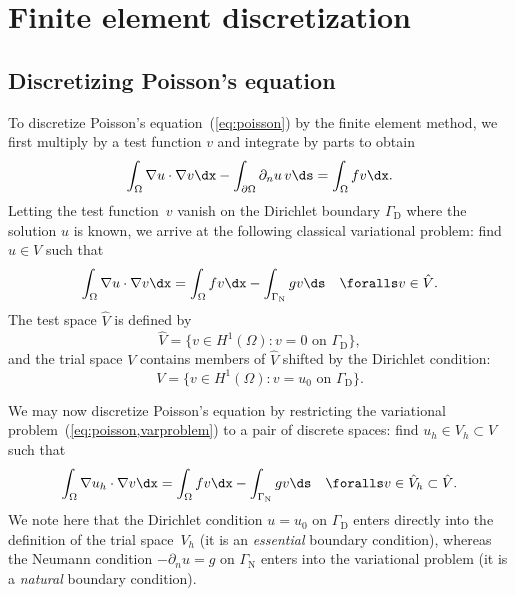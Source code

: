 \section{Finite element discretization}

\subsection{Discretizing Poisson's equation}

To discretize Poisson's equation~(\ref{eq:poisson}) by the finite
element method, we first multiply by a test function $v$ and integrate
by parts to obtain
\begin{equation}
  \int_{\Omega} \nabla u \cdot \nabla v \dx
  - \int_{\partial \Omega} \partial_n u \, v \ds
  =
  \int_{\Omega} f v \dx.
\end{equation}
Letting the test function~$v$ vanish on the Dirichlet boundary
$\Gamma_{\mathrm{D}}$ where the solution $u$ is known, we arrive at
the following classical variational problem: find $u \in V$ such that
\begin{equation} \label{eq:poisson,varproblem}
  \int_{\Omega} \nabla u \cdot \nabla v \dx =
  \int_{\Omega} f v \dx - \int_{\Gamma_{\mathrm{N}}} g v \ds
  \quad \foralls v \in \hat{V}.
\end{equation}
The test space $\hat{V}$ is defined by
\begin{equation}
  \hat{V} = \{v \in H^1(\Omega) : v = 0 \mbox{ on } \Gamma_{\mathrm{D}}\},
\end{equation}
and the trial space \( V \) contains members of \( \hat{V} \) shifted
by the Dirichlet condition:
\begin{equation}
  V = \{ v \in H^1(\Omega) : v = u_0 \mbox{ on } \Gamma_{\mathrm{D}} \}.
\end{equation}

We may now discretize Poisson's equation by restricting the
variational problem~(\ref{eq:poisson,varproblem}) to a pair of
discrete spaces: find $u_h \in V_h \subset V$ such that
\begin{equation} \label{eq:poisson,varproblem,discrete}
  \int_{\Omega} \nabla u_h \cdot \nabla v \dx =
  \int_{\Omega} f v \dx - \int_{\Gamma_{\mathrm{N}}} g v \ds
  \quad \foralls v \in \hat{V}_h \subset \hat{V}.
\end{equation}
We note here that the Dirichlet condition $u = u_0$ on
$\Gamma_{\mathrm{D}}$ enters directly into the definition of the trial
space~$V_h$ (it is an \emph{essential} boundary condition), whereas
the Neumann condition $-\partial_n u = g$ on $\Gamma_{\mathrm{N}}$
enters into the variational problem (it is a \emph{natural} boundary
condition).

